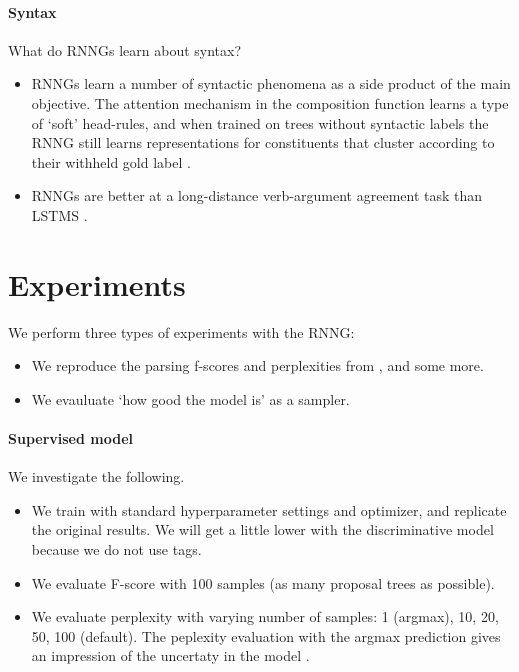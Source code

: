 \paragraph{Syntax} What do RNNGs learn about syntax?
\begin{itemize}
  \item RNNGs learn a number of syntactic phenomena as a side product of the main objective. The attention mechanism in the composition function learns a type of `soft' head-rules, and when trained on trees without syntactic labels the RNNG still learns representations for constituents that cluster according to their withheld gold label \citep{Kuncoro+2017:RNNG-syntax}.
  \item RNNGs are better at a long-distance verb-argument agreement task than LSTMS \cite{Linzen+2016:LSTM-syntax,Kuncoro+2018:RNNG-deps}.
\end{itemize}

\section{Experiments}
We perform three types of experiments with the RNNG:
\begin{itemize}
  \item We reproduce the parsing f-scores and perplexities from \citep{Dyer+2016:RNNG}, and some more.
  \item We evauluate `how good the model is' as a sampler.
\end{itemize}

\paragraph{Supervised model} We investigate the following.
\begin{itemize}
  \item We train with standard hyperparameter settings and optimizer, and replicate the original results. We will get a little lower with the discriminative model because we do not use tags.
  \item We evaluate F-score with 100 samples (as many proposal trees as possible).
  \item We evaluate perplexity with varying number of samples: 1 (argmax), 10, 20, 50, 100 (default). The peplexity evaluation with the argmax prediction gives an impression of the uncertaty in the model \citep{Buys+2018}.
\end{itemize}

